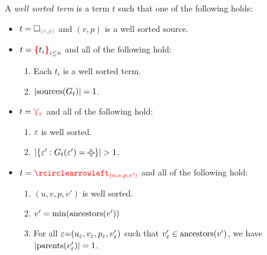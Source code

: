 \begin{definition}
  A \emph{well sorted term} is a term $t$ such that one of the following holds:
  \begin{itemize}

    \item $t = \emptyHole{v}{p}$ and $(v, p)$ is a well sorted source.

    \item $t = \conflictHole{t_i}_{i \leq n}$ and all of the following hold:
      \begin{enumerate}
        \item Each $t_i$ is a well sorted term.
        \item $\left\lvert\text{sources}\mathopen{}\left(G_t\right)\mathclose{}\right\rvert = 1$.
      \end{enumerate}

    \item $t = \textcolor{red}{\curlyveedownarrow_{\varepsilon}}$ and all of the following hold:
      \begin{enumerate}
        \item $\varepsilon$ is well sorted.
        \item $\SizeOf{\SetOf{\e' \SuchThat{G_t(\e') = \Plus}}} > 1$.
      \end{enumerate}

    \item $t = \cycleVertex{(u, v, p, v')}$ and all of the following hold:
      \begin{enumerate}
        \item $(u, v, p, v')$ is well sorted.
        \item $v' = \operatorname{\text{min}}\mathopen{}\left(\operatorname{\text{ancestors}}\mathopen{}\left(v'\right)\mathclose{}\right)\mathclose{}$
        \item For all $\varepsilon{=}(u_{\varepsilon}, v_{\varepsilon}, p_{\varepsilon}, v_{\varepsilon}')$
          such that $v_{\varepsilon}' \in \operatorname{\text{ancestors}}\mathopen{}\left(v'\right)\mathclose{}$,
          we have $\left\lvert\operatorname{\text{parents}}\mathopen{}\left(v_{\varepsilon}'\right)\mathclose{}\right\rvert = 1$.
      \end{enumerate}


\end{itemize}
\end{definition}
